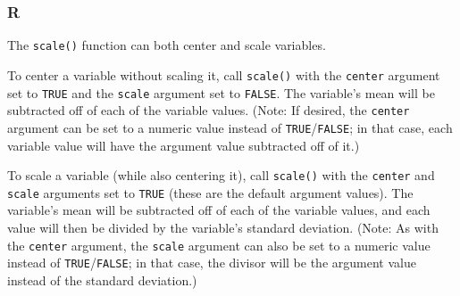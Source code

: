 \documentclass[
]{book}
\newenvironment{Shaded}{\begin{snugshade}}{\end{snugshade}}
\newcommand{\AttributeTok}[1]{\textcolor[rgb]{0.77,0.63,0.00}{#1}}
\newcommand{\DecValTok}[1]{\textcolor[rgb]{0.00,0.00,0.81}{#1}}
\newcommand{\FloatTok}[1]{\textcolor[rgb]{0.00,0.00,0.81}{#1}}
\newcommand{\FunctionTok}[1]{\textcolor[rgb]{0.00,0.00,0.00}{#1}}
\newcommand{\NormalTok}[1]{#1}
\newcommand{\OtherTok}[1]{\textcolor[rgb]{0.56,0.35,0.01}{#1}}
\newcommand{\SpecialCharTok}[1]{\textcolor[rgb]{0.00,0.00,0.00}{#1}}
\begin{document}
\hypertarget{r-40}{%
\subsubsection*{R}\label{r-40}}

The \texttt{scale()} function can both center and scale variables.

To center a variable without scaling it, call \texttt{scale()} with the \texttt{center} argument set to \texttt{TRUE} and the \texttt{scale} argument set to \texttt{FALSE}. The variable's mean will be subtracted off of each of the variable values. (Note: If desired, the \texttt{center} argument can be set to a numeric value instead of \texttt{TRUE}/\texttt{FALSE}; in that case, each variable value will have the argument value subtracted off of it.)

\begin{Shaded}
\end{Shaded}

To scale a variable (while also centering it), call \texttt{scale()} with the \texttt{center} and \texttt{scale} arguments set to \texttt{TRUE} (these are the default argument values). The variable's mean will be subtracted off of each of the variable values, and each value will then be divided by the variable's standard deviation. (Note: As with the \texttt{center} argument, the \texttt{scale} argument can also be set to a numeric value instead of \texttt{TRUE}/\texttt{FALSE}; in that case, the divisor will be the argument value instead of the standard deviation.)

\begin{Shaded}
\end{Shaded}
\end{document}
